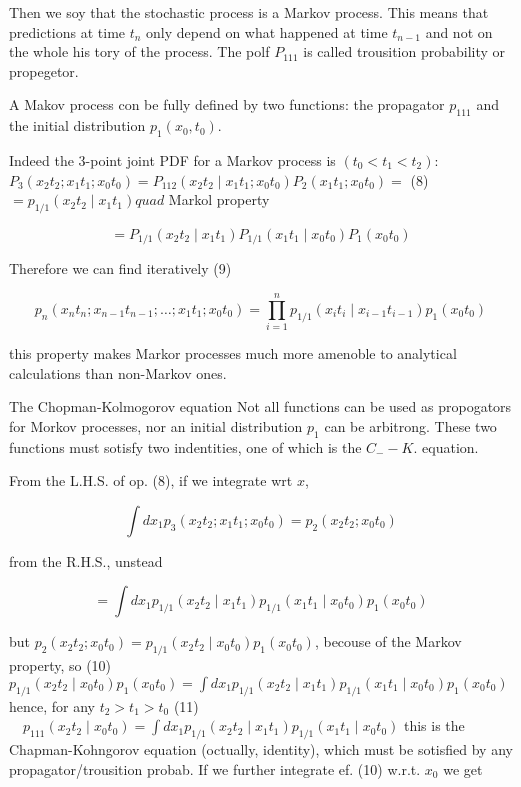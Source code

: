 Then we soy that the stochastic process is a Markov process. This means that predictions at time $t_{n}$ only depend on what happened at time $t_{n-1}$ and not on the whole his tory of the process. The polf $P_{111}$ is called trousition probability or propegetor.

A Makov process con be fully defined by two functions: the propagator $p_{111}$ and the initial distribution $p_{1}
\left(x_{0}, t_{0}\right)$.

Indeed the 3-point joint PDF for a Markov process is $\left(t_{0}<t_{1}<t_{2}\right)$: 
$P_{3}
\left(x_{2} t_{2} ; x_{1} t_{1} ; x_{0} t_{0}\right)=P_{112}
\left(x_{2} t_{2} \mid x_{1} t_{1} ; x_{0} t_{0}\right) P_{2}
\left(x_{1} t_{1} ; x_{0} t_{0}\right)=$
(8) $=p_{1 / 1}
\left(x_{2} t_{2} \mid x_{1} t_{1}\right) 
quad$ Markol property

$$ =P_{1 / 1}
\left(x_{2} t_{2} \mid x_{1} t_{1}\right) P_{1 / 1}
\left(x_{1} t_{1} \mid x_{0} t_{0}\right) P_{1}
\left(x_{0} t_{0}\right) $$

Therefore we can find iteratively
(9)

$$ p_{n}
\left(x_{n} t_{n} ; x_{n-1} t_{n-1} ; \ldots ; x_{1} t_{1} ; x_{0} t_{0}\right)=\prod_{i=1}^{n} p_{1 / 1}
\left(x_{i} t_{i} \mid x_{i-1} t_{i-1}\right) p_{1}
\left(x_{0} t_{0}\right) $$

this property makes Markor processes much more amenoble to analytical calculations than non-Markov ones.

The Chopman-Kolmogorov equation
Not all functions can be used as propogators for Morkov processes, nor an initial distribution $p_{1}$ can be arbitrong. These two functions must sotisfy two indentities, one of which is the $C_{-}-K$. equation.

From the L.H.S. of op. (8), if we integrate wrt $x$,

$$ \int d x_{1} p_{3}
\left(x_{2} t_{2} ; x_{1} t_{1} ; x_{0} t_{0}\right)=p_{2}
\left(x_{2} t_{2} ; x_{0} t_{0}\right) $$

from the R.H.S., unstead

$$ =\int d x_{1} p_{1 / 1}
\left(x_{2} t_{2} \mid x_{1} t_{1}\right) p_{1 / 1}
\left(x_{1} t_{1} \mid x_{0} t_{0}\right) p_{1}
\left(x_{0} t_{0}\right) $$

but $p_{2}
\left(x_{2} t_{2} ; x_{0} t_{0}\right)=p_{1 / 1}
\left(x_{2} t_{2} \mid x_{0} t_{0}\right) p_{1}
\left(x_{0} t_{0}\right)$, becouse of the Markov property, so
(10)
$p_{1 / 1}
\left(x_{2} t_{2} \mid x_{0} t_{0}\right) p_{1}
\left(x_{0} t_{0}\right)=\int d x_{1} p_{1 / 1}
\left(x_{2} t_{2} \mid x_{1} t_{1}\right) p_{1 / 1}
\left(x_{1} t_{1} \mid x_{0} t_{0}\right) p_{1}
\left(x_{0} t_{0}\right)$
hence, for any $t_{2}>t_{1}>t_{0}$
(11) $\quad p_{111}
\left(x_{2} t_{2} \mid x_{0} t_{0}\right)=\int d x_{1} p_{1 / 1}
\left(x_{2} t_{2} \mid x_{1} t_{1}\right) p_{1 / 1}
\left(x_{1} t_{1} \mid x_{0} t_{0}\right)$
this is the Chapman-Kohngorov equation (octually, identity), which must be sotisfied by any propagator/trousition probab. If we further integrate ef. (10) w.r.t. $x_{0}$ we get


